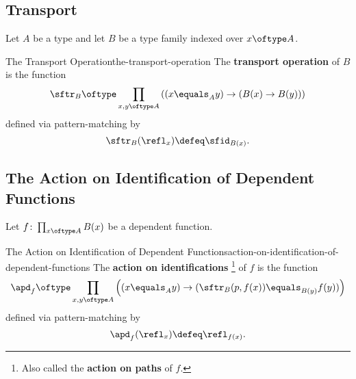 \subsection{Transport}\label{subsection-martin-löf-type-theory-transport}
Let $A$ be a type and let $B$ be a type family indexed over $x\oftype A$.
\begin{definition}{The Transport Operation}{the-transport-operation}%
    The \textbf{transport operation} of $B$ is the function
    \[
        \sftr_{B}%
        \oftype%
        \prod_{x,y\oftype A}%
        \left(%
            (x\equals_{A}y)%
            \to%
            (B(x)\to B(y))%
        \right)%
    \]%
    defined via pattern-matching by
    \[
        \sftr_{B}(\refl_{x})%
        \defeq%
        \sfid_{B(x)}.%
    \]
\end{definition}
\subsection{The Action on Identification of Dependent Functions}\label{the-action-on-identification-of-dependent-functions}
Let $f\colon\prod_{x\oftype A}B(x)$ be a dependent function.
\begin{definition}{The Action on Identification of Dependent Functions}{action-on-identification-of-dependent-functions}%
    The \textbf{action on identifications}%
    \footnote{%
        Also called the \textbf{action on paths} of $f$.
        \par\vspace*{\TCBBoxCorrection}
    } %
    of $f$ is the function
    \[
        \apd_{f}%
        \oftype%
        \prod_{x,y\oftype A}\left((x\equals_{A}y)\to(\sftr_{B}(p,f(x))\equals_{B(y)}f(y))\right)%
    \]%
    defined via pattern-matching by
    \[
        \apd_{f}(\refl_{x})%
        \defeq%
        \refl_{f(x)}.%
    \]%
\end{definition}
\begin{appendices}

\end{appendices}

